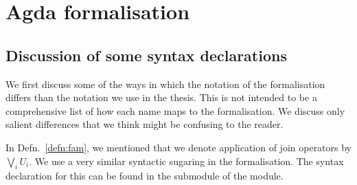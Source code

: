 \chapter{Agda formalisation}\label{app:agda-form}

\section{Discussion of some syntax declarations}

We first discuss some of the ways in which the notation of the \veragda{} formalisation
differs than the notation we use in the thesis. This is not intended to be a comprehensive
list of how each name maps to the \veragda{} formalisation. We discuss only salient
differences that we think might be confusing to the reader.

In Defn.~\ref{defn:fam}, we mentioned that we denote application of join operators by $\bigvee_i
U_i$. We use a very similar syntactic sugaring in the \veragda{} formalisation. The syntax
declaration for this can be found in the  submodule of the
 module.
\begin{code}%
\>[0]\AgdaSpace{}%
\AgdaSpace{}%
\AgdaSymbol{(}\AgdaSpace{}%
\AgdaSymbol{:}\AgdaSpace{}%
\AgdaSpace{}%
\AgdaSymbol{)}\AgdaSpace{}%
\AgdaSymbol{\{}\AgdaSpace{}%
\AgdaSymbol{:}\AgdaSpace{}%
\AgdaSymbol{\}}\AgdaSpace{}%
\AgdaSymbol{(}\AgdaSpace{}%
\AgdaSymbol{:}\AgdaSpace{}%
\AgdaSpace{}%
\AgdaSpace{}%
\AgdaSpace{}%
\AgdaSpace{}%
\AgdaSymbol{)}\AgdaSpace{}%
\<%
\\
%
\\[\AgdaEmptyExtraSkip]%
\>[0][@{}l@{\AgdaIndent{0}}]%
\>[2]\AgdaSpace{}%
\AgdaSymbol{:}\AgdaSpace{}%
\AgdaSymbol{\{}\AgdaSpace{}%
\AgdaSymbol{:}\AgdaSpace{}%
\AgdaSpace{}%
\AgdaSymbol{\}}\AgdaSpace{}%
\AgdaSpace{}%
\AgdaSymbol{(}\AgdaSpace{}%
\AgdaSpace{}%
\AgdaSymbol{)}\AgdaSpace{}%
\AgdaSpace{}%
\<%
\\
%
\>[2]\AgdaSpace{}%
\AgdaSymbol{\{}\AgdaSpace{}%
\AgdaSymbol{=}\AgdaSpace{}%
\AgdaSymbol{\}}\AgdaSpace{}%
\AgdaSpace{}%
\AgdaSymbol{=}\AgdaSpace{}%
\AgdaSpace{}%
\AgdaSymbol{(}\AgdaSpace{}%
\AgdaOperator{\AgdaInductiveConstructor{,}}\AgdaSpace{}%
\AgdaSymbol{)}\<%
\\
%
\\[\AgdaEmptyExtraSkip]%
%
\>[2]\AgdaSpace{}%
\AgdaSpace{}%
\AgdaSpace{}%
\AgdaSpace{}%
\AgdaSpace{}%
\AgdaSymbol{)}\AgdaSpace{}%
\AgdaSymbol{=}\AgdaSpace{}%
\AgdaSpace{}%
\AgdaSpace{}%
\AgdaSpace{}%
\<%
\end{code}

